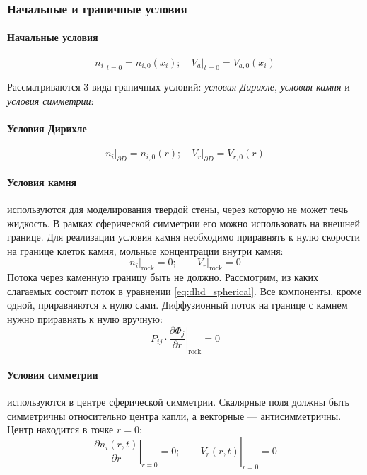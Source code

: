 \subsubsection{Начальные и граничные условия \label{dhd:boundary_conditions}}
\paragraph{Начальные условия}
\begin{equation} \label{eq:initial_conditions_dhd}
n_i \vert_{t=0} = n_{i, 0} (x_i); \quad V_a \vert_{t=0} = V_{a, 0}(x_i)
\end{equation}

Рассматриваются 3 вида граничных условий: \textit{условия Дирихле}, \textit{условия камня} и \textit{условия симметрии}:
\paragraph{Условия Дирихле}
\begin{equation} \label{eq:dirichlet_dhd}
n_i \vert_{\partial D} = n_{i, 0}(r); \quad \left. V_r \right \vert_{\partial D} = V_{r, 0}(r) 
\end{equation}
\paragraph{Условия камня} используются для моделирования твердой стены, через которую не может течь жидкость. В рамках сферической симметрии его можно использовать на внешней границе. Для реализации условия камня необходимо приравнять к нулю скорости на границе клеток камня, мольные концентрации внутри камня: 
\begin{equation}
n_i \vert_{\textrm{rock}} = 0;
\quad \quad
V_r \vert_{\textrm{rock}} = 0
\end{equation}
Потока через каменную границу быть не должно. Рассмотрим, из каких слагаемых состоит поток в уравнении \eqref{eq:dhd_spherical}. Все компоненты, кроме одной, приравняются к нулю сами. Диффузионный поток на границе с камнем нужно приравнять к нулю вручную:
\begin{equation}
\left. P_{ij} \cdot \frac{\partial \Phi_j}{\partial r} \right \vert_{\textrm{rock}} = 0
\end{equation}
\paragraph{Условия симметрии} используются в центре сферической симметрии. Скалярные поля должны быть симметричны относительно центра капли, а векторные --- антисимметричны. Центр находится в точке $r = 0$:
\begin{equation} \label{eq:symmetry}
\left. \left. \frac{\partial n_i (r, t)} {\partial r} \right \vert_{r=0} = 0; 
\quad \quad
V_r(r, t) \right \vert_{r=0} = 0
\end{equation}
